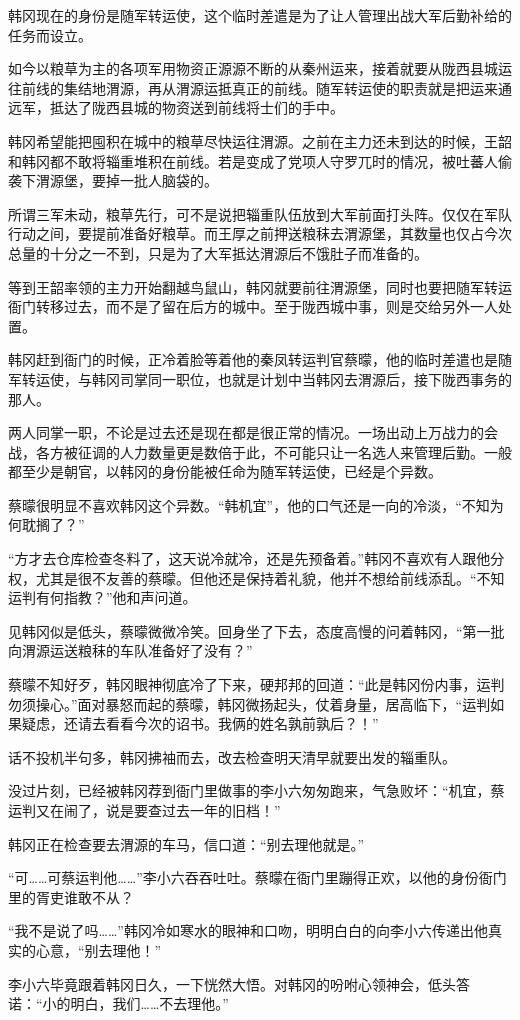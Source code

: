 韩冈现在的身份是随军转运使，这个临时差遣是为了让人管理出战大军后勤补给的任务而设立。

如今以粮草为主的各项军用物资正源源不断的从秦州运来，接着就要从陇西县城运往前线的集结地渭源，再从渭源运抵真正的前线。随军转运使的职责就是把运来通远军，抵达了陇西县城的物资送到前线将士们的手中。

韩冈希望能把囤积在城中的粮草尽快运往渭源。之前在主力还未到达的时候，王韶和韩冈都不敢将辎重堆积在前线。若是变成了党项人守罗兀时的情况，被吐蕃人偷袭下渭源堡，要掉一批人脑袋的。

所谓三军未动，粮草先行，可不是说把辎重队伍放到大军前面打头阵。仅仅在军队行动之间，要提前准备好粮草。而王厚之前押送粮秣去渭源堡，其数量也仅占今次总量的十分之一不到，只是为了大军抵达渭源后不饿肚子而准备的。

等到王韶率领的主力开始翻越鸟鼠山，韩冈就要前往渭源堡，同时也要把随军转运衙门转移过去，而不是了留在后方的城中。至于陇西城中事，则是交给另外一人处置。

韩冈赶到衙门的时候，正冷着脸等着他的秦凤转运判官蔡曚，他的临时差遣也是随军转运使，与韩冈司掌同一职位，也就是计划中当韩冈去渭源后，接下陇西事务的那人。

两人同掌一职，不论是过去还是现在都是很正常的情况。一场出动上万战力的会战，各方被征调的人力数量更是数倍于此，不可能只让一名选人来管理后勤。一般都至少是朝官，以韩冈的身份能被任命为随军转运使，已经是个异数。

蔡曚很明显不喜欢韩冈这个异数。“韩机宜”，他的口气还是一向的冷淡，“不知为何耽搁了？”

“方才去仓库检查冬料了，这天说冷就冷，还是先预备着。”韩冈不喜欢有人跟他分权，尤其是很不友善的蔡曚。但他还是保持着礼貌，他并不想给前线添乱。“不知运判有何指教？”他和声问道。

见韩冈似是低头，蔡曚微微冷笑。回身坐了下去，态度高慢的问着韩冈，“第一批向渭源运送粮秣的车队准备好了没有？”

蔡曚不知好歹，韩冈眼神彻底冷了下来，硬邦邦的回道：“此是韩冈份内事，运判勿须操心。”面对暴怒而起的蔡曚，韩冈微扬起头，仗着身量，居高临下，“运判如果疑虑，还请去看看今次的诏书。我俩的姓名孰前孰后？！”

话不投机半句多，韩冈拂袖而去，改去检查明天清早就要出发的辎重队。

没过片刻，已经被韩冈荐到衙门里做事的李小六匆匆跑来，气急败坏：“机宜，蔡运判又在闹了，说是要查过去一年的旧档！”

韩冈正在检查要去渭源的车马，信口道：“别去理他就是。”

“可……可蔡运判他……”李小六吞吞吐吐。蔡曚在衙门里蹦得正欢，以他的身份衙门里的胥吏谁敢不从？

“我不是说了吗……”韩冈冷如寒水的眼神和口吻，明明白白的向李小六传递出他真实的心意，“别去理他！”

李小六毕竟跟着韩冈日久，一下恍然大悟。对韩冈的吩咐心领神会，低头答诺：“小的明白，我们……不去理他。”

